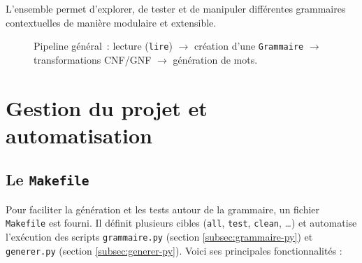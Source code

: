 \documentclass[a4paper,12pt]{article}
\begin{document}
L’ensemble permet d’explorer, de tester et de manipuler différentes grammaires contextuelles de manière modulaire et extensible.


\begin{figure}[h!]
\centering
{}%
\caption{Pipeline général : lecture (\texttt{lire}) \(\to\) création d’une \texttt{Grammaire} \(\to\) transformations CNF/GNF \(\to\) génération de mots.}
\label{fig:pipeline}
\end{figure}

\section{Gestion du projet et automatisation}
\label{sec:makefile-req}

\subsection{Le \texttt{Makefile}}
\label{subsec:makefile}

Pour faciliter la génération et les tests autour de la grammaire, un fichier \texttt{Makefile} est fourni. Il définit plusieurs cibles (\texttt{all}, \texttt{test}, \texttt{clean}, \ldots) et automatise l’exécution des scripts \texttt{grammaire.py} (section \ref{subsec:grammaire-py}) et \texttt{generer.py} (section \ref{subsec:generer-py}). Voici ses principales fonctionnalités :
\end{document}
